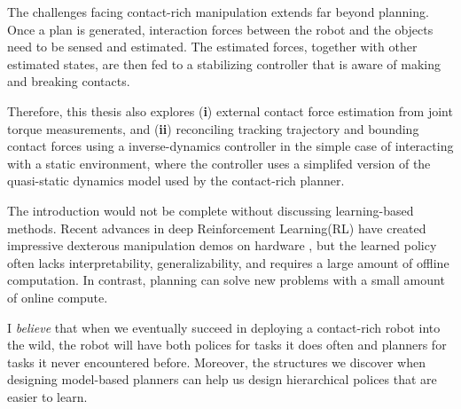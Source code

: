 The challenges facing contact-rich manipulation extends far beyond planning. Once a plan is generated, interaction forces between the robot and the objects need to be sensed and estimated. The estimated forces, together with other estimated states, are then fed to a stabilizing controller that is aware of making and breaking contacts. 

Therefore, this thesis also explores (\textbf{i}) external contact force estimation from joint torque measurements, and (\textbf{ii}) reconciling tracking trajectory and bounding contact forces using a inverse-dynamics controller in the simple case of interacting with a static environment, where the controller uses a simplifed version of the quasi-static dynamics model used by the contact-rich planner.

The introduction would not be complete without discussing learning-based methods. Recent advances in deep Reinforcement Learning(RL) have created impressive  dexterous manipulation demos on hardware \cite{andrychowicz2020learning}, but the learned policy often lacks interpretability, generalizability, and requires a large amount of offline computation.
In contrast, planning can solve new problems with a small amount of online compute. 

I \emph{believe} that when we eventually succeed in deploying a contact-rich robot into the wild, the robot will have both polices for tasks it does often and planners for tasks it never encountered before. Moreover, the structures we discover when designing model-based planners can help us design hierarchical polices that are easier to learn. 



